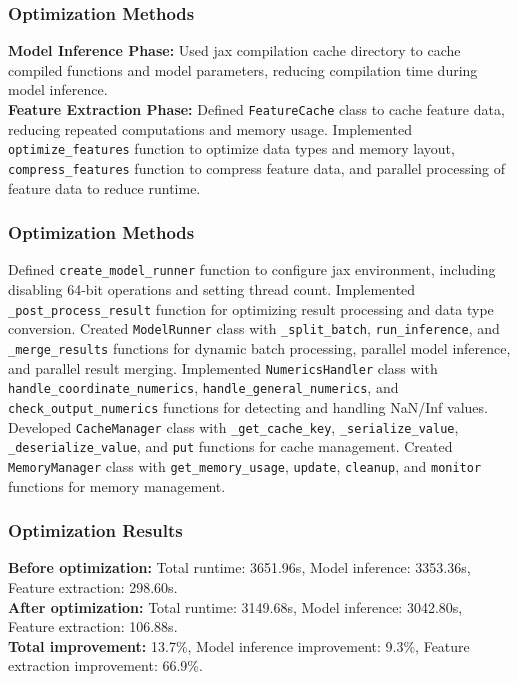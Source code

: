 \documentclass[a4paper,12pt]{article}
\begin{document}
\subsubsection{Optimization Methods}
\textbf{Model Inference Phase:} Used jax compilation cache directory to cache compiled functions and model parameters, reducing compilation time during model inference. \\
\textbf{Feature Extraction Phase:} Defined \texttt{FeatureCache} class to cache feature data, reducing repeated computations and memory usage. Implemented \texttt{optimize\_features} function to optimize data types and memory layout, \texttt{compress\_features} function to compress feature data, and parallel processing of feature data to reduce runtime.

\subsubsection{Optimization Methods}
Defined \texttt{create\_model\_runner} function to configure jax environment, including disabling 64-bit operations and setting thread count. Implemented \texttt{\_post\_process\_result} function for optimizing result processing and data type conversion. Created \texttt{ModelRunner} class with \texttt{\_split\_batch}, \texttt{run\_inference}, and \texttt{\_merge\_results} functions for dynamic batch processing, parallel model inference, and parallel result merging. Implemented \texttt{NumericsHandler} class with \texttt{handle\_coordinate\_numerics}, \texttt{handle\_general\_numerics}, and \texttt{check\_output\_numerics} functions for detecting and handling NaN/Inf values. Developed \texttt{CacheManager} class with \texttt{\_get\_cache\_key}, \texttt{\_serialize\_value}, \texttt{\_deserialize\_value}, and \texttt{put} functions for cache management. Created \texttt{MemoryManager} class with \texttt{get\_memory\_usage}, \texttt{update}, \texttt{cleanup}, and \texttt{monitor} functions for memory management.

\subsubsection{Optimization Results}
\textbf{Before optimization:} Total runtime: 3651.96s, Model inference: 3353.36s, Feature extraction: 298.60s. \\
\textbf{After optimization:} Total runtime: 3149.68s, Model inference: 3042.80s, Feature extraction: 106.88s. \\
\textbf{Total improvement:} 13.7\%, Model inference improvement: 9.3\%, Feature extraction improvement: 66.9\%.
\end{document}
